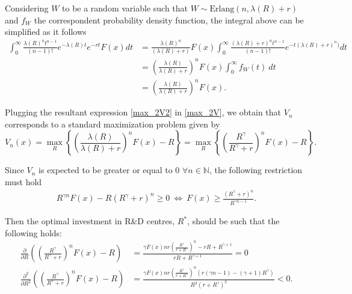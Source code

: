 Considering $W$ to be a random variable such that $W \sim \text{Erlang}(n, \lambda(R)+r)$ and $f_W$ the correspondent probability density function, the integral above can be simplified as it follows
\begin{align}
\int_0 ^\infty \frac{\lambda(R)^n t^{n-1}}{(n-1)!} e^{-\lambda(R)t} e^{-rt} F(x) dt &=
\frac{\lambda(R)^n}{(\lambda(R)+r)} F(x) \int_0 ^\infty \frac{(\lambda(R)+r)^n t^{n-1}}{(n-1)!} e^{-t(\lambda(R)+r)^n)} dt \nonumber \\
&=\left( \frac{\lambda(R)}{\lambda(R)+r}\right)^n F(x)  \int_0 ^\infty f_W(t) \ dt \nonumber \\
&=\left( \frac{\lambda(R)}{\lambda(R)+r}\right)^n F(x). \label{max_2V2}
\end{align}

Plugging the resultant expression \eqref{max_2V2} in \eqref{max_2V}, we obtain that $V_n$ corresponds to a standard maximization problem given by
\begin{equation}
V_n(x)=\max_R \left\{ \left( \frac{\lambda(R)}{\lambda(R)+r}\right)^n F(x)-R \right\}=\max_R \left\{ \left( \frac{R^\gamma}{R^\gamma+r}\right)^n F(x)-R \right\}.
	\label{max_2V3}
\end{equation}

Since $V_n$ is expected to be greater or equal to 0 $\forall n \in \mathds{N}$, the following restriction must hold
\begin{align}
R^{\gamma n} F(x)-R(R^\gamma + r)^n \geq 0 \  \Leftrightarrow \ F(x) \geq \frac{(R^\gamma+r)^n}{R^{\gamma n -1}}.
\label{max_2rest}
\end{align}


Then the optimal investment in R\&D centres, $R^*$, should be such that the following holds:
\begin{align}
\frac{\partial}{\partial R} \left( \left( \frac{R^\gamma}{R^\gamma+r}\right)^n F(x)-R \right) &= \frac{\gamma  F(x) n r \left(\frac{R^{\gamma }}{r+R^{\gamma }}\right)^n-r R+R^{\gamma +1}}{r R+R^{\gamma +1}}=0 \label{max_2ddR}\\
\frac{\partial^2}{\partial R^2} \left( \left( \frac{R^\gamma}{R^\gamma+r}\right)^n F(x)-R\right) &=
\frac{\gamma  F(x) n r \left(\frac{R^{\gamma }}{r+R^{\gamma }}\right)^n \left(r (\gamma  n-1)-(\gamma +1) R^{\gamma }\right)}{R^2 \left(r+R^{\gamma }\right)^2}<0.
\label{max_2d2dR2}
\end{align}

